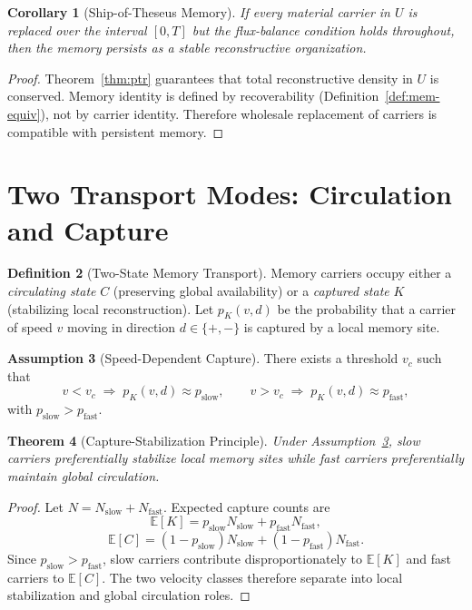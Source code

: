 \documentclass[12pt, oneside]{book}
\theoremstyle{plain}
\newtheorem{theorem}{Theorem}[chapter]
\newtheorem{corollary}[theorem]{Corollary}
\theoremstyle{definition}
\newtheorem{definition}[theorem]{Definition}
\newtheorem{assumption}[theorem]{Assumption}
\theoremstyle{remark}
\begin{document}
\begin{corollary}[Ship-of-Theseus Memory]
If every material carrier in $U$ is replaced over the
interval $[0, T]$ but the flux-balance condition holds
throughout, then the memory persists as a stable
reconstructive organization.
\end{corollary}

\begin{proof}
Theorem~\ref{thm:ptr} guarantees that total reconstructive
density in $U$ is conserved.
Memory identity is defined by recoverability
(Definition~\ref{def:mem-equiv}), not by carrier identity.
Therefore wholesale replacement of carriers is compatible
with persistent memory.
\end{proof}

\section{Two Transport Modes: Circulation and Capture}

\begin{definition}[Two-State Memory Transport]
Memory carriers occupy either a \emph{circulating state}
$C$ (preserving global availability) or a
\emph{captured state} $K$ (stabilizing local reconstruction).
Let $p_K(v, d)$ be the probability that a carrier of
speed $v$ moving in direction
$d \in \{+, -\}$ is captured by a local memory site.
\end{definition}

\begin{assumption}[Speed-Dependent Capture]
\label{assump:speed-capture}
There exists a threshold $v_c$ such that
\[
  v < v_c \;\Rightarrow\; p_K(v, d) \approx p_{\mathrm{slow}},
  \qquad
  v > v_c \;\Rightarrow\; p_K(v, d) \approx p_{\mathrm{fast}},
\]
with $p_{\mathrm{slow}} > p_{\mathrm{fast}}$.
\end{assumption}

\begin{theorem}[Capture-Stabilization Principle]
Under Assumption~\ref{assump:speed-capture},
slow carriers preferentially stabilize local memory sites
while fast carriers preferentially maintain global
circulation.
\end{theorem}

\begin{proof}
Let $N = N_{\mathrm{slow}} + N_{\mathrm{fast}}$.
Expected capture counts are
\[
  \mathbb{E}[K]
  = p_{\mathrm{slow}} N_{\mathrm{slow}}
  + p_{\mathrm{fast}} N_{\mathrm{fast}},
\]
\[
  \mathbb{E}[C]
  = (1 - p_{\mathrm{slow}}) N_{\mathrm{slow}}
  + (1 - p_{\mathrm{fast}}) N_{\mathrm{fast}}.
\]
Since $p_{\mathrm{slow}} > p_{\mathrm{fast}}$,
slow carriers contribute disproportionately to $\mathbb{E}[K]$
and fast carriers to $\mathbb{E}[C]$.
The two velocity classes therefore separate into
local stabilization and global circulation roles.
\end{proof}
\end{document}
